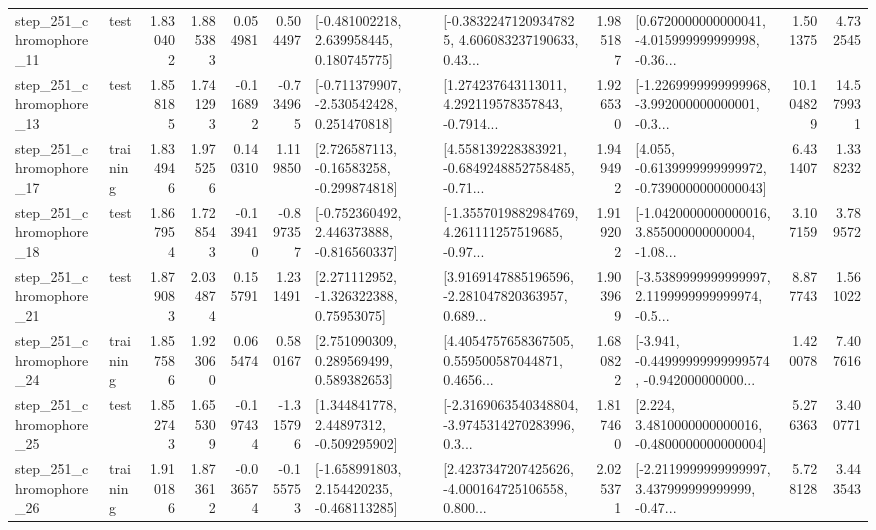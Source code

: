 \begin{tabular}{llrrrrllrlrr}
  step\_251\_chromophore\_11 &      test &      1.830402 &    1.885383 &      0.054981 &  0.504497 &    [-0.481002218, 2.639958445, 0.180745775] &  [-0.38322471209347825, 4.606083237190633, 0.43... &       1.985187 &  [0.6720000000000041, -4.015999999999998, -0.36... &            1.501375 &          4.732545 \\
  step\_251\_chromophore\_13 &      test &      1.858185 &    1.741293 &     -0.116892 & -0.734965 &   [-0.711379907, -2.530542428, 0.251470818] &  [1.274237643113011, 4.292119578357843, -0.7914... &       1.926530 &  [-1.2269999999999968, -3.992000000000001, -0.3... &           10.104829 &         14.579931 \\
  step\_251\_chromophore\_17 &  training &      1.834946 &    1.975256 &      0.140310 &  1.119850 &    [2.726587113, -0.16583258, -0.299874818] &  [4.558139228383921, -0.6849248852758485, -0.71... &       1.949492 &  [4.055, -0.6139999999999972, -0.7390000000000043] &            6.431407 &          1.338232 \\
  step\_251\_chromophore\_18 &      test &      1.867954 &    1.728543 &     -0.139410 & -0.897357 &   [-0.752360492, 2.446373888, -0.816560337] &  [-1.3557019882984769, 4.261111257519685, -0.97... &       1.919202 &  [-1.0420000000000016, 3.855000000000004, -1.08... &            3.107159 &          3.789572 \\
  step\_251\_chromophore\_21 &      test &      1.879083 &    2.034874 &      0.155791 &  1.231491 &     [2.271112952, -1.326322388, 0.75953075] &  [3.9169147885196596, -2.281047820363957, 0.689... &       1.903969 &  [-3.5389999999999997, 2.1199999999999974, -0.5... &            8.877743 &          1.561022 \\
  step\_251\_chromophore\_24 &  training &      1.857586 &    1.923060 &      0.065474 &  0.580167 &     [2.751090309, 0.289569499, 0.589382653] &  [4.4054757658367505, 0.559500587044871, 0.4656... &       1.680822 &  [-3.941, -0.44999999999999574, -0.942000000000... &            1.420078 &          7.407616 \\
  step\_251\_chromophore\_25 &      test &      1.852743 &    1.655309 &     -0.197434 & -1.315796 &     [1.344841778, 2.44897312, -0.509295902] &  [-2.3169063540348804, -3.9745314270283996, 0.3... &       1.817460 &   [2.224, 3.4810000000000016, -0.4800000000000004] &            5.276363 &          3.400771 \\
  step\_251\_chromophore\_26 &  training &      1.910186 &    1.873612 &     -0.036574 & -0.155753 &   [-1.658991803, 2.154420235, -0.468113285] &  [2.4237347207425626, -4.000164725106558, 0.800... &       2.025371 &  [-2.2119999999999997, 3.437999999999999, -0.47... &            5.728128 &          3.443543 \\

\end{tabular}
